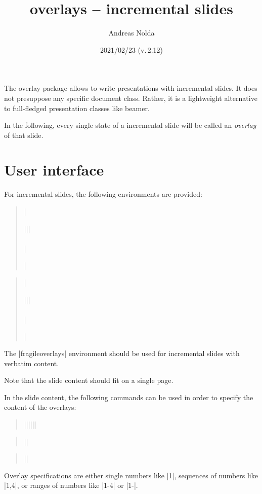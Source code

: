 \documentclass[a4paper]{ltxdoc}
\begin{document}
\title{\textsf{overlays} -- incremental slides}
\author{Andreas Nolda}
\date{2021/02/23 (v.\,2.12)}
\maketitle

\noindent The \textsf{overlay} package allows to write presentations with
incremental slides. It does not presuppose any specific document class. Rather,
it is a lightweight alternative to full-fledged presentation classes like
\textsf{beamer}.

In the following, every single state of a incremental slide will be called an
\emph{overlay} of that slide.

\section{User interface}

For incremental slides, the following environments are provided:
\begin{quote}
|\begin{overlays}{||}| \\
 \\
|\end{overlays}|
\end{quote}
\begin{quote}
|\begin{fragileoverlays}{||}| \\
 \\
|\end{fragileoverlays}|
\end{quote}
The |fragileoverlays| environment should be used for incremental slides with
verbatim content.

Note that the slide content should fit on a single page.

\DescribeMacro{\alert}
\DescribeMacro{\visible}
\DescribeMacro{\only}
In the slide content, the following commands can be used in order
to specify the content of the overlays:
\begin{quote}
|\alert{||}{||}|
\end{quote}
\begin{quote}
||
\end{quote}
\begin{quote}
||
\end{quote} Overlay specifications are either single numbers like |1|, sequences
of numbers like |1,4|, or ranges of numbers like |1-4| or |1-|.
\end{document}
